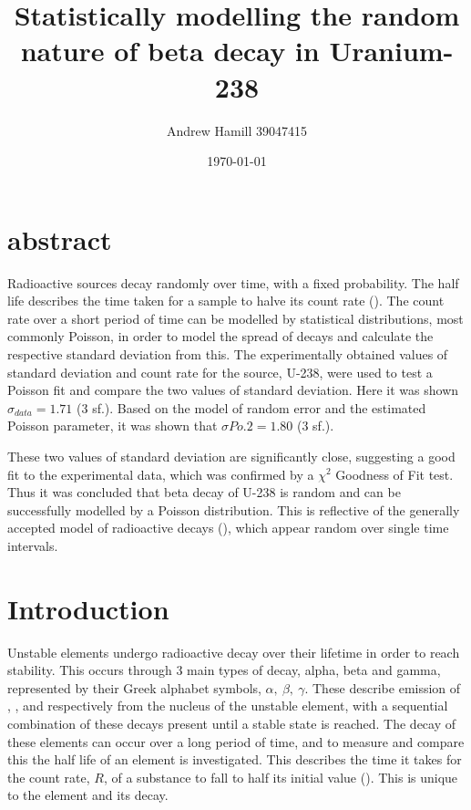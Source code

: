 \documentclass[11pt]{article}
\begin{document}
\title{\vspace{-1cm}Statistically modelling the random nature of beta decay in Uranium-238}
    \author{Andrew Hamill 39047415}
    \date{\today}
    \maketitle
    \section{abstract}
Radioactive sources decay randomly over time, with a fixed probability. The half life describes the time taken for a sample to halve its count rate (\cite{YF}). The count rate over a short period of time can be modelled by statistical distributions, most commonly Poisson, in order to model the spread of decays and calculate the respective standard deviation from this. The experimentally obtained values of standard deviation and count rate for the source, U-238, were used to test a Poisson fit and compare the two values of standard deviation. Here it was shown $\sigma_{data} = 1.71$ (3 sf.). Based on the model of random error and the estimated Poisson parameter, it was shown that $\sigma{Po.2} = 1.80$ (3 sf.).
     
\noindent These two values of standard deviation are significantly close, suggesting a good fit to the experimental data, which was confirmed by a $\chi^{2}$ Goodness of Fit test. Thus it was concluded that beta decay of U-238 is random and can be successfully modelled by a Poisson distribution. This is reflective of the generally accepted model of radioactive decays (\cite{YF}), which appear random over single time intervals.  
    \section{Introduction}
Unstable elements undergo radioactive decay over their lifetime in order to reach stability. This occurs through 3 main types of decay, alpha, beta and gamma, represented by their Greek alphabet symbols, $\alpha,\  \beta,\ \gamma$.  These describe emission of , , and  respectively from the nucleus of the unstable element, with a sequential combination of these decays present until a stable state is reached. The decay of these elements can occur over a long period of time, and to measure and compare this the half life of an element is investigated. This describes the time it takes for the count rate, $R$, of a substance to fall to half its initial value (\cite{Magill2005}). This is unique to the element and its decay.
    
\end{document}

